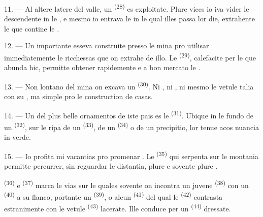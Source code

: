 11. --- Al altere latere del valle, un 
\textsuperscript{(28)} es exploitate. Plure vices io iva vider le 
descendente in le , e mesmo io entrava le  in le
qual illes passa lor die, extrahente le  que contine le
.

12. --- Un importante  esseva construite presso le mina pro
utilisar immediatemente le ricchessas que on extrahe de illo. Le  \textsuperscript{(29)}, calefacite per le  que
abunda hic, permitte obtener rapidemente e a bon mercato le .

13. --- Non lontano del mina on excava un 
\textsuperscript{(30)}. Ni , ni , ni mesmo
 le vetule  talia con su , ma simple
 pro le construction de casas.

14. --- Un del plus belle ornamentos de iste pais es le 
\textsuperscript{(31)}. Ubique in le fundo de un 
\textsuperscript{(32)}, sur le ripa de un 
\textsuperscript{(33)}, de un  \textsuperscript{(34)} o de un
precipitio, lor tenue acos nuancia in verde.

\VUsaut{3.0mm}
\VUsaut{3.0mm}

15. --- Io profita mi vacantias pro promenar . Le
 \textsuperscript{(35)} qui serpenta sur le montania permitte
percurrer, sin reguardar le distantia, plure  e sovente plure
.

 \textsuperscript{(36)} e 
\textsuperscript{(37)} marca le vias sur le quales sovente on incontra un juvene
 \textsuperscript{(38)} con un 
\textsuperscript{(40)} a su flanco, portante un 
\textsuperscript{(39)}, o alcun  \textsuperscript{(41)} del qual
le  \textsuperscript{(42)} contrasta estranimente con le
vetule  \textsuperscript{(43)} lacerate. Ille conduce per un
 \textsuperscript{(44)} dressate.

\VUsaut{3.0mm}

